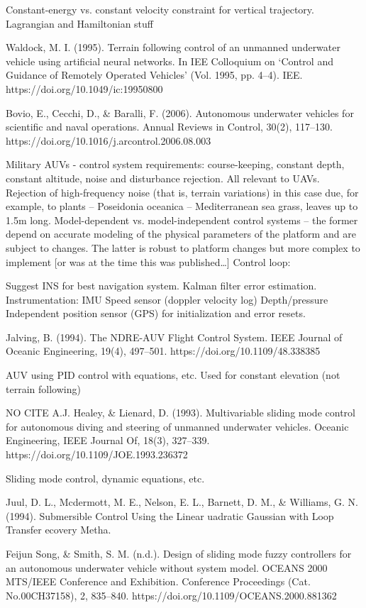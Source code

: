 \documentclass[10pt]{article}
\begin{document}
Constant-energy vs. constant velocity constraint for vertical trajectory.
Lagrangian and Hamiltonian stuff

\cite{Waldock1995}
Waldock, M. I. (1995). Terrain following control of an unmanned underwater vehicle using artificial neural networks. In IEE Colloquium on `Control and Guidance of Remotely Operated Vehicles’ (Vol. 1995, pp. 4–4). IEE. https://doi.org/10.1049/ic:19950800

\cite{Bovio2006}
Bovio, E., Cecchi, D., \& Baralli, F. (2006). Autonomous underwater vehicles for scientific and naval operations. Annual Reviews in Control, 30(2), 117–130. https://doi.org/10.1016/j.arcontrol.2006.08.003

Military AUVs - control system requirements: course-keeping, constant depth, constant altitude, noise and disturbance rejection. All relevant to UAVs.
Rejection of high-frequency noise (that is, terrain variations) in this case due, for example, to plants -- Poseidonia oceanica -- Mediterranean sea grass, leaves up to 1.5m long.
Model-dependent vs. model-independent control systems -- the former depend on accurate modeling of the physical parameters of the platform and are subject to changes. The latter is robust to platform changes but more complex to implement [or was at the time this was published…]
Control loop:

Suggest INS for best navigation system.
Kalman filter error estimation.
Instrumentation:
IMU
Speed sensor (doppler velocity log)
Depth/pressure
Independent position sensor (GPS) for initialization and error resets.

\cite{Jalving1994}
Jalving, B. (1994). The NDRE-AUV Flight Control System. IEEE Journal of Oceanic Engineering, 19(4), 497–501. https://doi.org/10.1109/48.338385

AUV using PID control with equations, etc.
Used for constant elevation (not terrain following)

NO CITE
A.J. Healey, \& Lienard, D. (1993). Multivariable sliding mode control for autonomous diving and steering of unmanned underwater vehicles. Oceanic Engineering, IEEE Journal Of, 18(3), 327–339. https://doi.org/10.1109/JOE.1993.236372

Sliding mode control, dynamic equations, etc.

\cite{Juul1994}
Juul, D. L., Mcdermott, M. E., Nelson, E. L., Barnett, D. M., \& Williams, G. N. (1994). Submersible Control Using the Linear uadratic Gaussian with Loop Transfer ecovery Metha.

\cite{FeijunSong}
Feijun Song, \& Smith, S. M. (n.d.). Design of sliding mode fuzzy controllers for an autonomous underwater vehicle without system model. OCEANS 2000 MTS/IEEE Conference and Exhibition. Conference Proceedings (Cat. No.00CH37158), 2, 835–840. https://doi.org/10.1109/OCEANS.2000.881362
\end{document}
